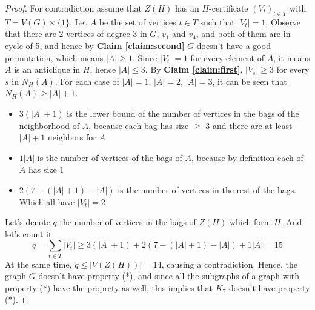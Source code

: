 \begin{proof}
    For contradiction assume that $Z(H)$ has an $H$-certificate $(V_{t})_{t \in T}$ with $T = V(G) \times \{1\}$.
    Let $A$ be the set of vertices $t \in T$ such that $|V_t| = 1$. Observe that there are 2 vertices of degree 3 in $G$,
    $v_1$ and $v_4$, and both of them are in cycle of 5, and hence by \textbf{Claim \ref{claim:second}} $G$ doesn't
    have a good permutation, which means $|A| \geq 1$. Since $|V_{t}| = 1$ for every element of $A$, it means
    $A$ is an anticlique in $H$, hence $|A| \leq 3$. By \textbf{Claim \ref{claim:first}}, $|V_s| \geq 3$ for every $s$ in $N_{H}(A)$.
    For each case of $|A| = 1$, $|A| = 2$, $|A| = 3$, it can be seen that $N_{H}(A) \geq |A| + 1$.
    \begin{itemize}
        \item $3(|A| + 1)$ is the lower bound of the number of vertices in the bags of the neighborhood of $A$, because each bag has size $\geq$ 3  and there are at least $|A| + 1$ neighbors for $A$
        \item $1|A|$ is the number of vertices of the bags of $A$, because by definition each of $A$ has size 1
        \item $2(7 - (|A| + 1) - |A|)$ is the number of vertices in the rest of the bags. Which all have $|V_t| = 2$
    \end{itemize}
    Let's denote $q$ the number of vertices in the bags of $Z(H)$ which form $H$. And let's count it.
    \begin{equation}
        q = \sum_{t \in T} |V_t| \geq 3(|A| + 1) + 2(7 - (|A| + 1) - |A|) + 1|A| = 15
    \end{equation}
    At the same time, $q \leq |V(Z(H))| = 14$, causing a contradiction. Hence, the graph $G$ doesn't have property (*),
    and since all the subgraphs of a graph with property (*) have the proprety as well, this implies that $K_7$ doesn't have 
    property (*).
\end{proof}